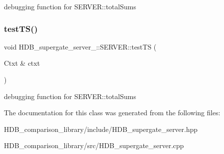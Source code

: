 debugging function for S\+E\+R\+V\+E\+R\+::total\+Sums \mbox{\label{classHDB__supergate__server___1_1SERVER_a4b6051325021088c25ad409b302cef55}} 
\subsubsection{\texorpdfstring{test\+T\+S()}{testTS()}\hspace{0.1cm}{\footnotesize\ttfamily [2/2]}}
{\footnotesize\ttfamily void H\+D\+B\+\_\+supergate\+\_\+server\+\_\+\+::\+S\+E\+R\+V\+E\+R\+::test\+TS (\begin{DoxyParamCaption}\item[{Ctxt \&}]{ctxt }\end{DoxyParamCaption})}

debugging function for S\+E\+R\+V\+E\+R\+::total\+Sums 

The documentation for this class was generated from the following files\+:\begin{DoxyCompactItemize}
\item 
H\+D\+B\+\_\+comparison\+\_\+library/include/H\+D\+B\+\_\+supergate\+\_\+server.\+hpp\item 
H\+D\+B\+\_\+comparison\+\_\+library/src/H\+D\+B\+\_\+supergate\+\_\+server.\+cpp\end{DoxyCompactItemize}
